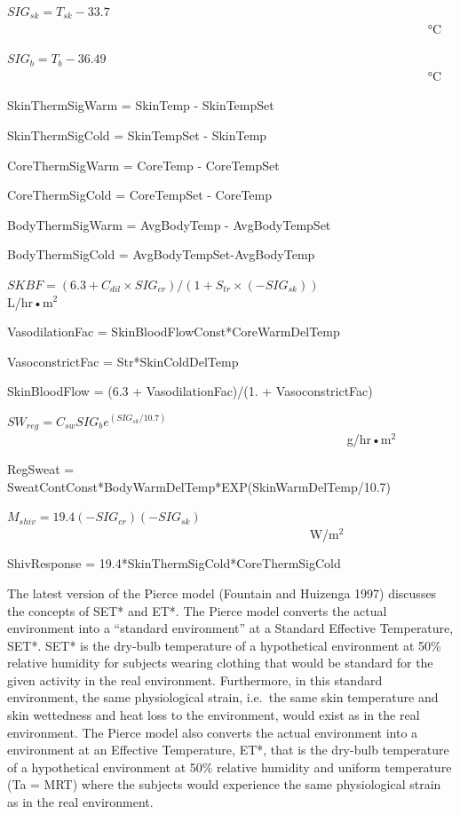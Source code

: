 \(SI{G_{sk}} = {T_{sk}} - 33.7\) ~~~~~~~~~~~~~~~~~~~~~~~~~~~~~~~~~~~~~~~~~~~~~~~~~~~~~~~~~~~~~~~~~~~ °C

\(SI{G_b} = {T_b} - 36.49\) ~~~~~~~~~~~~~~~~~~~~~~~~~~~~~~~~~~~~~~~~~~~~~~~~~~~~~~~~~~~~~~~~~~~ °C

SkinThermSigWarm = SkinTemp - SkinTempSet

SkinThermSigCold = SkinTempSet - SkinTemp

CoreThermSigWarm = CoreTemp - CoreTempSet

CoreThermSigCold = CoreTempSet - CoreTemp

BodyThermSigWarm = AvgBodyTemp - AvgBodyTempSet

BodyThermSigCold = AvgBodyTempSet-AvgBodyTemp

\(SKBF = (6.3 + C{}_{dil} \times SI{G_{cr}})/(1 + {S_{tr}} \times ( - SI{G_{sk}}))\) ~~~~~~~~~~~~~~~~~~~~~ L/hr•m\(^{2}\)

VasodilationFac = SkinBloodFlowConst*CoreWarmDelTemp

VasoconstrictFac = Str*SkinColdDelTemp

SkinBloodFlow = (6.3 + VasodilationFac)/(1. + VasoconstrictFac)

\(S{W_{reg}} = {C_{sw}}SI{G_b}{e^{(SI{G_{sk}}/10.7)}}\) ~~~~~~~~~~~~~~~~~~~~~~~~~~~~~~~~~~~~~~~~~~~~~~~~~~~~~~ g/hr•m\(^{2}\)

RegSweat = SweatContConst*BodyWarmDelTemp*EXP(SkinWarmDelTemp/10.7)

\({M_{shiv}} = 19.4( - SI{G_{cr}})( - SI{G_{sk}})\) ~~~~~~~~~~~~~~~~~~~~~~~~~~~~~~~~~~~~~~~~~~~~~~~~ W/m\(^{2}\)

ShivResponse = 19.4*SkinThermSigCold*CoreThermSigCold

The latest version of the Pierce model (Fountain and Huizenga 1997) discusses the concepts of SET* and ET*. The Pierce model converts the actual environment into a ``standard environment'' at a Standard Effective Temperature, SET*. SET* is the dry-bulb temperature of a hypothetical environment at 50\% relative humidity for subjects wearing clothing that would be standard for the given activity in the real environment. Furthermore, in this standard environment, the same physiological strain, i.e.~the same skin temperature and skin wettedness and heat loss to the environment, would exist as in the real environment. The Pierce model also converts the actual environment into a environment at an Effective Temperature, ET*, that is the dry-bulb temperature of a hypothetical environment at 50\% relative humidity and uniform temperature (Ta = MRT) where the subjects would experience the same physiological strain as in the real environment.

